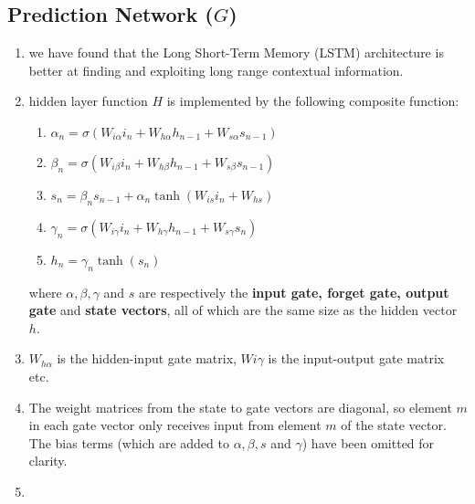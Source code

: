 \subsection{Prediction Network ($G$)}

\begin{enumerate}
    \item we have found that the Long Short-Term Memory (LSTM) architecture is better at finding and exploiting long range contextual information.
    \hfill \cite{arxiv/1211.3711/Sequence-Transduction-RNN}

    \item hidden layer function $H$ is implemented by the following composite function:
    \begin{multicols}{2}
    \begin{enumerate}
        \item $\alpha _n = \sigma  (W_{i\alpha }i_n + W_{h\alpha }h_{n-1} + W_{s\alpha }s_{n-1})$
        \hfill \cite{arxiv/1211.3711/Sequence-Transduction-RNN}

        \item $\beta _n = \sigma  (W_{i\beta } i_n + W_{h\beta } h_{n-1} + W_{s\beta } s_{n-1})$
        \hfill \cite{arxiv/1211.3711/Sequence-Transduction-RNN}

        \item $s_n = \beta _ns_{n-1} + \alpha _n \tanh (W_{is}i_n + W_{hs}) $
        \hfill \cite{arxiv/1211.3711/Sequence-Transduction-RNN}

        \item $\gamma _n = \sigma  (W_{i\gamma } i_n + W_{h\gamma } h_{n-1} + W_{s\gamma } s_n)$
        \hfill \cite{arxiv/1211.3711/Sequence-Transduction-RNN}

        \item $h_n = \gamma _n \tanh(s_n) $
        \hfill \cite{arxiv/1211.3711/Sequence-Transduction-RNN}
    \end{enumerate}
    \end{multicols}
    where $\alpha, \beta, \gamma$ and $s$ are respectively the \textbf{input gate, forget gate, output gate} and \textbf{state vectors}, all of which are the same size as the hidden vector $h$. 
    \item $W_{h\alpha}$ is the hidden-input gate matrix, $W{i\gamma}$ is the input-output gate matrix etc.
    \hfill \cite{arxiv/1211.3711/Sequence-Transduction-RNN}

    \item The weight matrices from the state to gate vectors are diagonal, so element $m$ in each gate vector only receives input from element $m$ of the state vector. 
    The bias terms (which are added to $\alpha, \beta, s$ and $\gamma$) have been omitted for clarity.
    \hfill \cite{arxiv/1211.3711/Sequence-Transduction-RNN}

    \item 
\end{enumerate}








